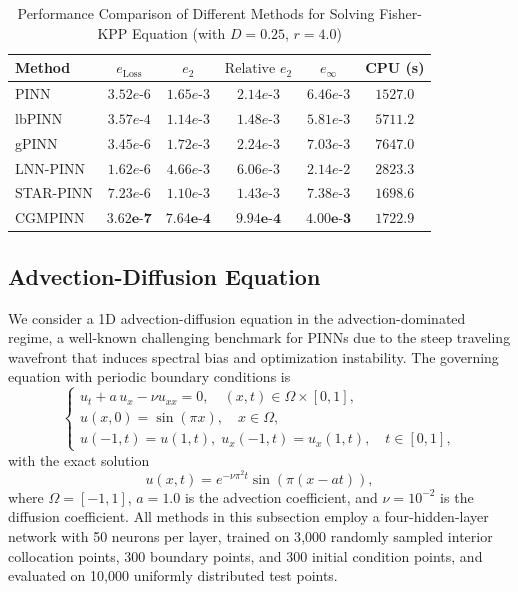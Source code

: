 \documentclass{article}
\theoremstyle{plain}
\theoremstyle{definition}
\theoremstyle{remark}
\begin{document}
\begin{table}[t]
	\centering
	\caption{Performance Comparison of Different Methods for Solving Fisher-KPP Equation (with $D = 0.25$, $r = 4.0$)}
	\label{tab:fisher_kpp_pinn_methods_performance}
	\begin{tabular}{lccccc}
		\toprule
		Method & $e_{\text{Loss}}$ & $e_2$ & $\text{Relative } e_2$ & $e_\infty$ & CPU (s) \\
		\midrule
		PINN               & $3.52e\text{-}6$ & $1.65e\text{-}3$ & $2.14e\text{-}3$ & $6.46e\text{-}3$ & $1527.0$   \\
		lbPINN             & $3.57e\text{-}4$ & $1.14e\text{-}3$ & $1.48e\text{-}3$ & $5.81e\text{-}3$ & $5711.2$   \\
		gPINN              & $3.45e\text{-}6$ & $1.72e\text{-}3$ & $2.24e\text{-}3$ & $7.03e\text{-}3$ & $7647.0$   \\
		LNN-PINN           & $1.62e\text{-}6$ & $4.66e\text{-}3$ & $6.06e\text{-}3$ & $2.14e\text{-}2$ & $2823.3$   \\
		STAR-PINN          & $7.23e\text{-}6$ & $1.10e\text{-}3$ & $1.43e\text{-}3$ & $7.38e\text{-}3$ & $1698.6$   \\
		CGMPINN            & $\mathbf{3.62e\text{-}7}$ & $\mathbf{7.64e\text{-}4}$ & $\mathbf{9.94e\text{-}4}$ & $\mathbf{4.00e\text{-}3}$ & $1722.9$   \\
		\bottomrule
	\end{tabular}
\end{table}

\subsection{Advection-Diffusion Equation}
\label{subsec:advection_diffusion}

We consider a 1D advection-diffusion equation in the advection-dominated regime, a well-known challenging benchmark for PINNs due to the steep traveling wavefront that induces spectral bias and optimization instability. The governing equation with periodic boundary conditions is
\begin{equation}
	\begin{cases}
		u_t + a\, u_x - \nu u_{xx} = 0,\quad (x,t) \in \Omega \times [0,1], \\
		u(x, 0) = \sin(\pi x),\quad x \in \Omega, \\
		u(-1, t) = u(1, t),\;
		u_x(-1, t) = u_x(1, t),\quad t \in [0,1],
	\end{cases}
	\label{eq:advection_diffusion}
\end{equation}
with the exact solution
\begin{equation}
	u(x, t) = e^{-\nu \pi^2 t} \sin(\pi (x - a t)),
	\label{eq:advection_diffusion_solution}
\end{equation}
where $\Omega=[-1,1]$, $a = 1.0$ is the advection coefficient, and $\nu = 10^{-2}$ is the diffusion coefficient. All methods in this subsection employ a four-hidden-layer network with 50 neurons per layer, trained on 3{,}000 randomly sampled interior collocation points, 300 boundary points, and 300 initial condition points, and evaluated on 10{,}000 uniformly distributed test points.
\end{document}
